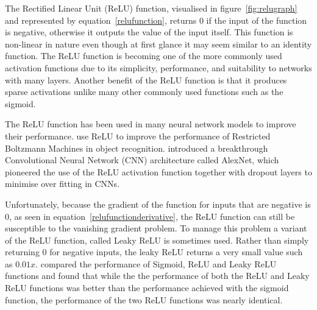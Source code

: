The Rectified Linear Unit (ReLU) function, visualised in figure~\ref{fig:relugraph} and represented by  equation~\ref{relufunction}, returns 0 if the input of the function is negative, otherwise it outputs the value of the input itself. This function is non-linear in nature even though at first glance it may seem similar to an identity function. The ReLU function is becoming one of the more commonly used activation functions due to its simplicity, performance, and suitability to networks with many layers. Another benefit of the ReLU function is that it produces sparse activations unlike many other commonly used functions such as the sigmoid. 

The ReLU function has been used in many neural network models to improve their performance. \citet{Nair2010} use ReLU to improve the performance of Restricted Boltzmann Machines in object recognition. \citet{KrizhevskyAlex2017Icwd} introduced a breakthrough Convolutional Neural Network (CNN) architecture called AlexNet, which pioneered the use of the ReLU activation function together with dropout layers to minimise over fitting in CNNs. 

Unfortunately, because the gradient of the function for inputs that are negative is 0, as seen in equation~\ref{relufunctionderivative}, the ReLU function can still be susceptible to the vanishing gradient problem. To manage this problem a variant of the ReLU function, called Leaky ReLU is sometimes used. Rather than simply returning 0 for negative inputs, the leaky ReLU returns a very small value such as $0.01x$. \citet{maas2013rectifier} compared the performance of Sigmoid, ReLU and Leaky ReLU functions and found that while the the performance of both the ReLU and Leaky ReLU functions was better than the performance achieved with the sigmoid function, the performance of the two ReLU functions was nearly identical.
